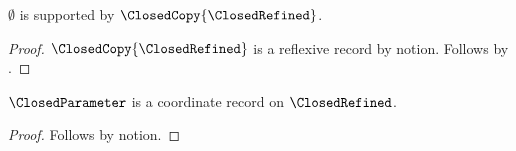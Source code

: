 

\begin{proposition}\label{closed_instance_import_guard}
    $\emptyset$ is supported by $\ClosedCopy{\ClosedRefined}$.
\end{proposition}
\begin{proof}
    $\ClosedCopy{\ClosedRefined}$ is a reflexive record by notion.
    Follows by .
\end{proof}

\begin{proposition}\label{closed_instance_import_notion}
    $\ClosedParameter$ is a coordinate record on $\ClosedRefined$.
\end{proposition}
\begin{proof}
    Follows by notion.
\end{proof}
